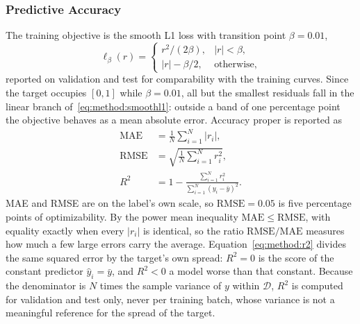\subsubsection{Predictive Accuracy}
\label{sec:method:experiment:metrics:accuracy}
The training objective is the smooth L1 loss with transition point $\beta = 0.01$,
\begin{equation}
    \ell_\beta(r) = \begin{cases}
        r^{2} / (2\beta), & |r| < \beta, \\
        |r| - \beta / 2, & \text{otherwise},
    \end{cases}
    \label{eq:method:smoothl1}
\end{equation}
reported on validation and test for comparability with the training curves. Since the
target occupies $[0, 1]$ while $\beta = 0.01$, all but the smallest residuals fall in the
linear branch of~\eqref{eq:method:smoothl1}: outside a band of one percentage point the
objective behaves as a mean absolute error. Accuracy proper is reported as
\begin{align}
    \mathrm{MAE} &= \frac{1}{N} \sum_{i=1}^{N} \left| r_i \right|,
    \label{eq:method:mae} \\
    \mathrm{RMSE} &= \sqrt{\frac{1}{N} \sum_{i=1}^{N} r_i^{2}},
    \label{eq:method:rmse} \\
    R^{2} &= 1 - \frac{\sum_{i=1}^{N} r_i^{2}}
        {\sum_{i=1}^{N} \left( y_i - \bar{y} \right)^{2}}.
    \label{eq:method:r2}
\end{align}
MAE and RMSE are on the label's own scale, so $\mathrm{RMSE} = 0.05$ is five percentage
points of optimizability. By the power mean inequality $\mathrm{MAE} \leq \mathrm{RMSE}$,
with equality exactly when every $\left| r_i \right|$ is identical, so the ratio
$\mathrm{RMSE} / \mathrm{MAE}$ measures how much a few large errors carry the average.
Equation~\eqref{eq:method:r2} divides the same squared error by the target's own spread:
$R^{2} = 0$ is the score of the constant predictor $\hat{y}_i = \bar{y}$, and $R^{2} < 0$ a
model worse than that constant. Because the denominator is $N$ times the sample variance of
$y$ within $\mathcal{D}$, $R^{2}$ is computed for validation and test only, never per
training batch, whose variance is not a meaningful reference for the spread of the target.

